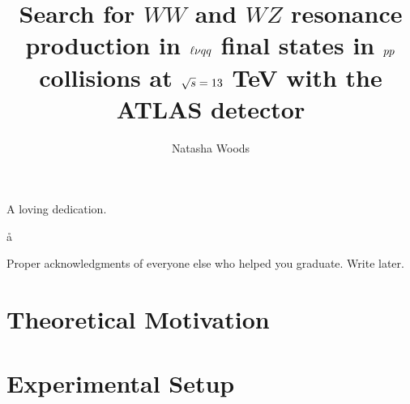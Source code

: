 





\title{Search for $WW$ and $WZ$ resonance production in $\ell\nu \MakeLowercase{qq}$ final states in $\MakeLowercase{pp}$ collisions at $\sqrt{\MakeLowercase{s}}=13$ TeV with the ATLAS detector}
\author{Natasha Woods}
\deanlinethree{}

\begin{frontmatter}
\maketitle

\copyrightpage

\tableofcontents


\listoffigures

\listoftables
\begin{abstract}

\end{abstract}

\begin{dedication}
\vspace*{\fill}
\begin{center}
A loving dedication.
\end{center}
\vspace*{\fill}å
\end{dedication}

\begin{acknowledgements}
Proper acknowledgments of everyone else who helped you graduate. Write later.
\end{acknowledgements}

\end{frontmatter}
\linenumbers


\part{Theoretical Motivation}


\part {Experimental Setup}

%

